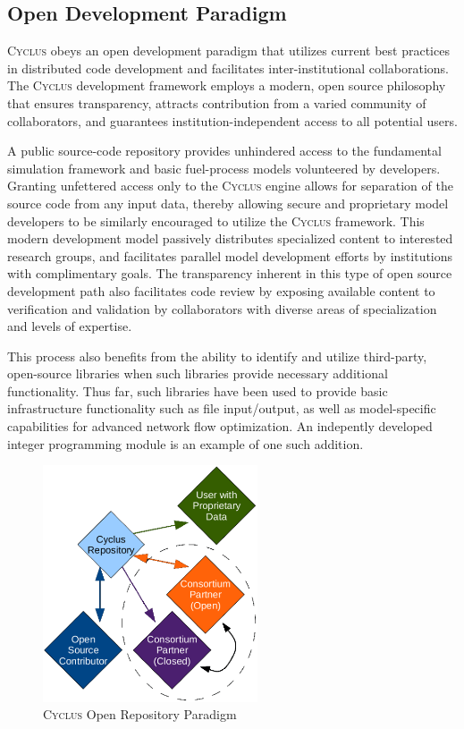 \documentclass{anstrans}
\newcommand{\Cyclus}{\textsc{Cyclus }}
\begin{document}
\subsection{Open Development Paradigm}

\Cyclus obeys an open development paradigm that utilizes current best
practices in distributed code development and facilitates
inter-institutional collaborations. The \Cyclus development framework
employs a modern, open source philosophy that ensures transparency,
attracts contribution from a varied community of collaborators, and
guarantees institution-independent access to all potential users.

A public source-code repository provides unhindered access to the
fundamental simulation framework and basic fuel-process models
volunteered by developers. Granting unfettered access only to the
\Cyclus engine allows for separation of the source code from any input
data, thereby allowing secure and proprietary model developers to be
similarly encouraged to utilize the \Cyclus framework. This modern
development model passively distributes specialized content to
interested research groups, and facilitates parallel model development
efforts by institutions with complimentary goals. The transparency
inherent in this type of open source development path also facilitates
code review by exposing available content to verification and
validation by collaborators with diverse areas of specialization and
levels of expertise.

This process also benefits from the ability to identify and utilize
third-party, open-source libraries when such libraries provide
necessary additional functionality. Thus far, such libraries have been
used to provide basic infrastructure functionality such as file
input/output, as well as model-specific capabilities for advanced
network flow optimization. An indepently developed integer programming
module is an example of one such addition.

\begin{figure}[h]
  \begin{center}
    \includegraphics[height=7cm]{openness.eps}
  \end{center}
  \caption{\Cyclus Open Repository Paradigm}
  \label{fig:openness}
\end{figure}
\end{document}
